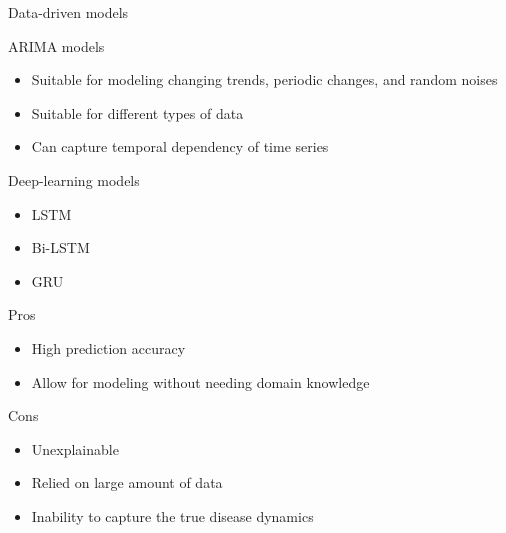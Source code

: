 \begin{frame}[allowframebreaks]{Data-driven models}

    ARIMA models \cite{ceylanEstimationCOVID19Prevalence2020,singhPredictionCOVID19Pandemic2020,ribeiroShorttermForecastingCOVID192020}
    \begin{itemize}
        \item Suitable for modeling changing trends, periodic changes, and random noises
        \item Suitable for different types of data
        \item Can capture temporal dependency of time series
    \end{itemize}

    \framebreak

    Deep-learning models \cite{chimmulaTimeSeriesForecasting2020,shahidPredictionsCOVID19Deep2020,ramchandaniDeepCOVIDNetInterpretableDeep2020}
    \begin{itemize}
        \item \gls{LSTM}
        \item \gls{Bi-LSTM}
        \item \gls{GRU}
    \end{itemize}

    \framebreak

    \begin{exampleblock}{Pros}
    \begin{itemize}
        \item High prediction accuracy
        \item Allow for modeling without needing domain knowledge
    \end{itemize}
    \end{exampleblock}

    \begin{alertblock}{Cons}
    \begin{itemize}
        \item Unexplainable
        \item Relied on large amount of data
        \item Inability to capture the true disease dynamics
    \end{itemize}
    \end{alertblock}

\end{frame}

